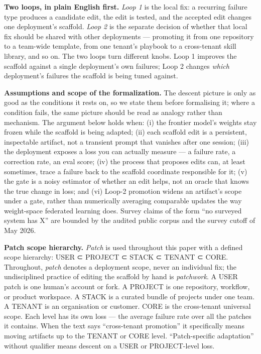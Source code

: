 \textbf{Two loops, in plain English first.} \emph{Loop 1} is the local
fix: a recurring failure type produces a candidate edit, the edit is
tested, and the accepted edit changes one deployment's scaffold.
\emph{Loop 2} is the separate decision of whether that local fix should
be shared with other deployments --- promoting it from one repository to
a team-wide template, from one tenant's playbook to a cross-tenant skill
library, and so on. The two loops turn different knobs. Loop 1 improves
the scaffold against a single deployment's own failures; Loop 2 changes
\emph{which} deployment's failures the scaffold is being tuned against.

\textbf{Assumptions and scope of the formalization.} The descent picture
is only as good as the conditions it rests on, so we state them before
formalising it; where a condition fails, the same picture should be read
as analogy rather than mechanism. The argument below holds when: (i) the
frontier model's weights stay frozen while the scaffold is being
adapted; (ii) each scaffold edit is a persistent, inspectable artifact,
not a transient prompt that vanishes after one session; (iii) the
deployment exposes a loss you can actually measure --- a failure rate, a
correction rate, an eval score; (iv) the process that proposes edits
can, at least sometimes, trace a failure back to the scaffold coordinate
responsible for it; (v) the gate is a noisy estimator of whether an edit
helps, not an oracle that knows the true change in loss; and (vi) Loop-2
promotion widens an artifact's scope under a gate, rather than
numerically averaging comparable updates the way weight-space federated
learning does. Survey claims of the form ``no surveyed system has X''
are bounded by the audited public corpus and the survey cutoff of May
2026.

\textbf{Patch scope hierarchy.} \emph{Patch} is used throughout this
paper with a defined scope hierarchy: USER ⊂ PROJECT ⊂ STACK ⊂ TENANT ⊂
CORE. Throughout, \emph{patch} denotes a deployment scope, never an
individual fix; the undisciplined practice of editing the scaffold by
hand is \emph{patchwork}. A USER patch is one human's account or fork. A PROJECT is one
repository, workflow, or product workspace. A STACK is a curated bundle
of projects under one team. A TENANT is an organisation or customer.
CORE is the cross-tenant universal scope. Each level has its own loss
--- the average failure rate over all the patches it contains. When the
text says ``cross-tenant promotion'' it specifically means moving
artifacts up to the TENANT or CORE level. ``Patch-specific adaptation''
without qualifier means descent on a USER or PROJECT-level loss.

